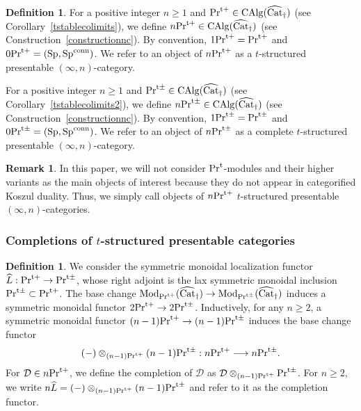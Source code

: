 \documentclass[leqno,12pt]{amsart}
\theoremstyle{plain}
\theoremstyle{definition}
\newtheorem{Definition}[Theorem]{Definition}
\newtheorem{Remark}[Theorem]{Remark}
\newcommand{\DDD}{\mathcal{D}}
\newcommand{\PRT}{\textup{Pr}^{\textup{t}}}
\newcommand{\PRTT}{\textup{Pr}^{\textup{t}+}}
\newcommand{\PRTTT}{\textup{Pr}^{\textup{t}\pm}}
\newcommand{\SP}{\operatorname{Sp}}
\newcommand{\SPC}{\operatorname{Sp}^{\textup{conn}}}
\newcommand{\Mod}{\operatorname{Mod}}
\newcommand{\CAlg}{\operatorname{CAlg}}
\newcommand{\vCat}{\widehat{\operatorname{Cat}}_\dagger}
\begin{document}
\begin{Definition}
For a positive integer $n\ge1$ and $\PRTT\in \CAlg(\vCat)$ (see Corollary~\ref{tstablecolimits}), we define $n\PRTT\in \CAlg(\vCat)$ (see Construction~\ref{constructionnc}).
By convention, $1\PRTT=\PRTT$ and $0\PRTT=(\SP,\SPC)$.
We refer to an object of $n\PRTT$ as a $t$-structured presentable $(\infty, n)$-category.


For a positive integer $n\ge1$ and $\PRTTT \in \CAlg(\vCat)$ (see Corollary~\ref{tstablecolimits2}), we define $n\PRTTT\in \CAlg(\vCat)$ (see Construction~\ref{constructionnc}).
By convention, $1\PRTTT=\PRTTT$ and $0\PRTTT=(\SP,\SPC)$.
We refer to an object of $n\PRTTT$ as a complete $t$-structured presentable $(\infty, n)$-category.
\end{Definition}

\begin{Remark}
In this paper, we will not consider $\PRT$-modules and their higher variants as the main objects of interest
because they do not appear in categorified Koszul duality.
Thus, we simply call objects of $n\PRTT$ $t$-structured presentable $(\infty, n)$-categories.
\end{Remark}

\subsubsection{Completions of $t$-structured presentable categories}



\begin{Definition}
We consider the symmetric monoidal localization functor $\widehat{L}:\PRTT\to \PRTTT$,
whose right adjoint is the lax symmetric monoidal inclusion $\PRTTT\subset \PRTT$.
The base change $\Mod_{\PRTT}(\vCat)\to \Mod_{\PRTTT}(\vCat)$
induces a symmetric monoidal functor $2\PRTT\to 2\PRTTT$.
Inductively, for any $n\ge2$,
a symmetric monoidal functor $(n-1)\PRTT\to (n-1)\PRTTT$ induces the base change functor
\[
(-)\otimes_{(n-1)\PRTT}(n-1)\PRTTT :n\PRTT\longrightarrow n\PRTTT.
\]
For $\DDD\in n\PRTT$, we define the completion of $\DDD$ as $\DDD\otimes_{(n-1)\PRTT}\PRTTT$.
For $n\ge2$, we write $n\widehat{L}=(-)\otimes_{(n-1)\PRTT}(n-1)\PRTTT$
and refer to it as the completion functor.
\end{Definition}
\end{document}
